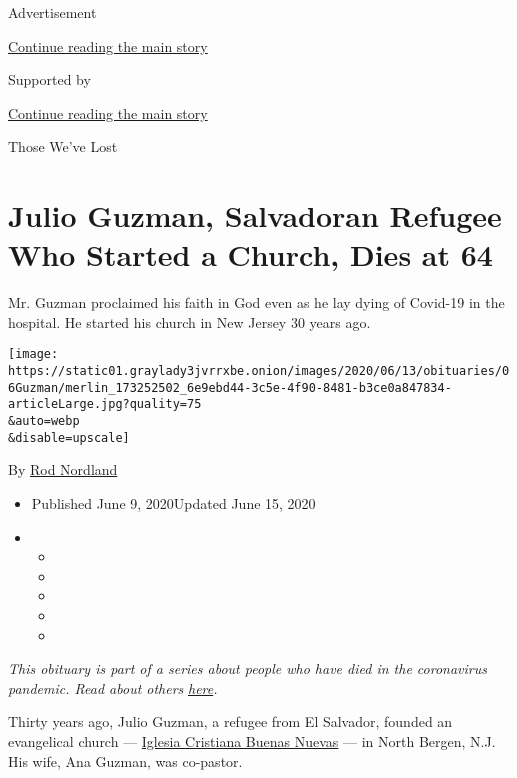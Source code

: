 Advertisement

\protect\hyperlink{after-top}{Continue reading the main story}

Supported by

\protect\hyperlink{after-sponsor}{Continue reading the main story}

Those We've Lost

\hypertarget{julio-guzman-salvadoran-refugee-who-started-a-church-dies-at-64}{%
\section{Julio Guzman, Salvadoran Refugee Who Started a Church, Dies at
64}\label{julio-guzman-salvadoran-refugee-who-started-a-church-dies-at-64}}

Mr. Guzman proclaimed his faith in God even as he lay dying of Covid-19
in the hospital. He started his church in New Jersey 30 years ago.

\texttt{[image: https://static01.graylady3jvrrxbe.onion/images/2020/06/13/obituaries/06Guzman/merlin\_173252502\_6e9ebd44-3c5e-4f90-8481-b3ce0a847834-articleLarge.jpg?quality=75\\\&auto=webp\\\&disable=upscale]}

By \href{https://www.nytimes3xbfgragh.onion/by/rod-nordland}{Rod
Nordland}

\begin{itemize}
\item
  Published June 9, 2020Updated June 15, 2020
\item
  \begin{itemize}
  \item
  \item
  \item
  \item
  \item
  \end{itemize}
\end{itemize}

\emph{This obituary is part of a series about people who have died in
the coronavirus pandemic. Read about others}
\href{https://www.nytimes3xbfgragh.onion/interactive/2020/obituaries/people-died-coronavirus-obituaries.html}{\emph{here}}\emph{.}

Thirty years ago, Julio Guzman, a refugee from El Salvador, founded an
evangelical church ---
\href{https://www.facebookcorewwwi.onion/pages/Iglesia-Cristiana-Buenas-Nuevas/113296232037352}{Iglesia
Cristiana Buenas Nuevas} --- in North Bergen, N.J. His wife, Ana Guzman,
was co-pastor.

